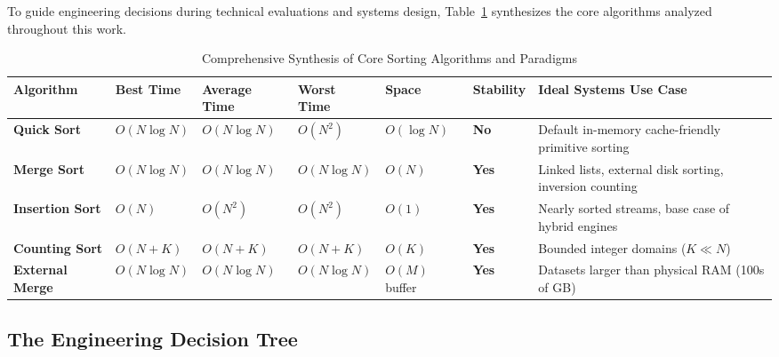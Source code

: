 \documentclass[10pt,journal,compsoc,onecolumn]{IEEEtran}
\begin{document}
To guide engineering decisions during technical evaluations and systems design, Table~\ref{tab:comparison} synthesizes the core algorithms analyzed throughout this work.

\begin{table}[t]
\centering
\caption{Comprehensive Synthesis of Core Sorting Algorithms and Paradigms}
\label{tab:comparison}
\begin{tabular}{@{}llllllp{4.2cm}@{}}
\toprule
\textbf{Algorithm} & \textbf{Best Time} & \textbf{Average Time} & \textbf{Worst Time} & \textbf{Space} & \textbf{Stability} & \textbf{Ideal Systems Use Case} \\ \midrule
\textbf{Quick Sort} & $O(N \log N)$ & $O(N \log N)$ & $O(N^2)$ & $O(\log N)$ & \textbf{No} & Default in-memory cache-friendly primitive sorting \\
\textbf{Merge Sort} & $O(N \log N)$ & $O(N \log N)$ & $O(N \log N)$ & $O(N)$ & \textbf{Yes} & Linked lists, external disk sorting, inversion counting \\
\textbf{Insertion Sort} & $O(N)$ & $O(N^2)$ & $O(N^2)$ & $O(1)$ & \textbf{Yes} & Nearly sorted streams, base case of hybrid engines \\
\textbf{Counting Sort} & $O(N + K)$ & $O(N + K)$ & $O(N + K)$ & $O(K)$ & \textbf{Yes} & Bounded integer domains ($K \ll N$) \\
\textbf{External Merge} & $O(N \log N)$ & $O(N \log N)$ & $O(N \log N)$ & $O(M)$ buffer & \textbf{Yes} & Datasets larger than physical RAM (100s of GB) \\ \bottomrule
\end{tabular}
\end{table}

\subsection{The Engineering Decision Tree}
\end{document}
